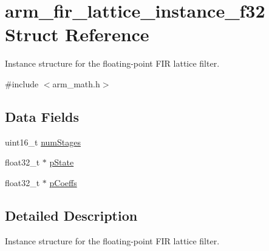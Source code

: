 \hypertarget{structarm__fir__lattice__instance__f32}{\section{arm\-\_\-fir\-\_\-lattice\-\_\-instance\-\_\-f32 Struct Reference}
\label{structarm__fir__lattice__instance__f32}
}


Instance structure for the floating-\/point F\-I\-R lattice filter.  




{\ttfamily \#include $<$arm\-\_\-math.\-h$>$}

\subsection*{Data Fields}
\begin{DoxyCompactItemize}
\item 
uint16\-\_\-t \hyperlink{structarm__fir__lattice__instance__f32_a4cceb90547b3e585d4c7aabaa8057212}{num\-Stages}
\item 
float32\-\_\-t $\ast$ \hyperlink{structarm__fir__lattice__instance__f32_a335c87e6fdc4b96601d95a5de8b9c463}{p\-State}
\item 
float32\-\_\-t $\ast$ \hyperlink{structarm__fir__lattice__instance__f32_aacbb8dd8eeba4b21fc2bb40076405ee3}{p\-Coeffs}
\end{DoxyCompactItemize}


\subsection{Detailed Description}
Instance structure for the floating-\/point F\-I\-R lattice filter. 

